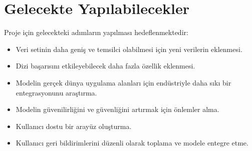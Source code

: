 \section{Gelecekte Yapılabilecekler}
Proje için gelecekteki adımların yapılması hedeflenmektedir:
\begin{itemize}
\item Veri setinin daha geniş ve temsilci olabilmesi için yeni verilerin eklenmesi.
\item Dizi başarısını etkileyebilecek daha fazla özellik eklenmesi.
\item Modelin gerçek dünya uygulama alanları için endüstriyle daha sıkı bir entegrasyonunu araştırma.
\item Modelin güvenilirliğini ve güvenliğini artırmak için önlemler alma.
\item Kullanıcı dostu bir arayüz oluşturma.
\item Kullanıcı geri bildirimlerini düzenli olarak toplama ve modele entegre etme.
\end{itemize}